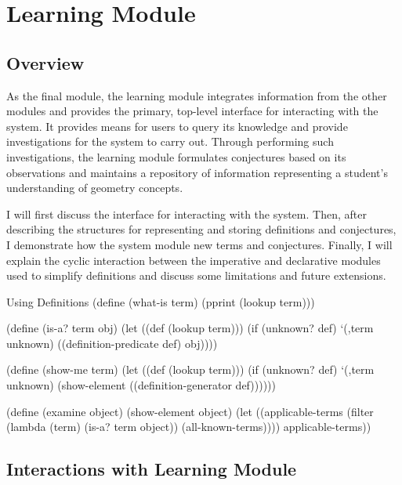 \chapter{Learning Module}
\label{chap:learning}

\section{Overview}

As the final module, the learning module integrates information from
the other modules and provides the primary, top-level interface for
interacting with the system. It provides means for users to query its
knowledge and provide investigations for the system to carry
out. Through performing such investigations, the learning module
formulates conjectures based on its observations and maintains a
repository of information representing a student's understanding of
geometry concepts.

I will first discuss the interface for interacting with the
system. Then, after describing the structures for representing and
storing definitions and conjectures, I demonstrate how the system
module new terms and conjectures. Finally, I will explain the cyclic
interaction between the imperative and declarative modules used to
simplify definitions and discuss some limitations and future
extensions.


\begin{code-example}{Using Definitions}
(define (what-is term)
  (pprint (lookup term)))

(define (is-a? term obj)
  (let ((def (lookup term)))
    (if (unknown? def)
        `(,term unknown)
        ((definition-predicate def) obj))))

(define (show-me term)
  (let ((def (lookup term)))
    (if (unknown? def)
        `(,term unknown)
        (show-element ((definition-generator def))))))

(define (examine object)
  (show-element object)
  (let ((applicable-terms
         (filter (lambda (term)
                   (is-a? term object))
                 (all-known-terms))))
    applicable-terms))
\end{code-example}

\section{Interactions with Learning Module}

